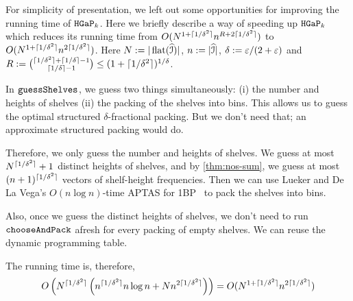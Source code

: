 For simplicity of presentation, we left out some opportunities for improving the running
time of $\operatorname{\mathtt{HGaP}}_{k}$. Here we briefly describe a way of speeding up $\operatorname{\mathtt{HGaP}}_{k}$
which reduces its running time from $O(N^{1+\lceil 1/\delta^2 \rceil}n^{R+2\lceil 1/\delta^2 \rceil})$ to
$O(N^{1+\lceil 1/\delta^2 \rceil}n^{2\lceil 1/\delta^2 \rceil})$.
Here $N := |\operatorname{flat}(\widehat{\mathcal{I}})|$, $n := |\widehat{\mathcal{I}}|$, $\delta := \varepsilon/(2+\varepsilon)$
and $R := \binom{\lceil 1/\delta^2 \rceil + \left\lceil 1/\delta \right\rceil-1}{\left\lceil 1/\delta \right\rceil-1}
\le (1+\lceil 1/\delta^2 \rceil)^{1/\delta}$.

In $\operatorname{\mathtt{guessShelves}}$, we guess two things simultaneously:
(i) the number and heights of shelves
(ii) the packing of the shelves into bins.
This allows us to guess the optimal structured $\delta$-fractional packing.
But we don't need that; an approximate structured packing would do.

Therefore, we only guess the number and heights of shelves.
We guess at most $N^{\lceil 1/\delta^2 \rceil}+1$ distinct heights of shelves,
and by \cref{thm:nos-sum}, we guess at most $(n+1)^{\lceil 1/\delta^2 \rceil}$ vectors
of shelf-height frequencies.
Then we can use Lueker and De La Vega's $O(n\log n)$-time APTAS for
1BP~\cite{bp-aptas} to pack the shelves into bins.

Also, once we guess the distinct heights of shelves,
we don't need to run $\operatorname{\mathtt{chooseAndPack}}$ afresh for every packing of empty shelves.
We can reuse the dynamic programming table.

The running time is, therefore,
\[ O\left(N^{\lceil 1/\delta^2 \rceil}\left(n^{\lceil 1/\delta^2 \rceil} n\log n + Nn^{2\lceil 1/\delta^2 \rceil}\right)\right)
= O(N^{1+\lceil 1/\delta^2 \rceil}n^{2\lceil 1/\delta^2 \rceil}) \]
